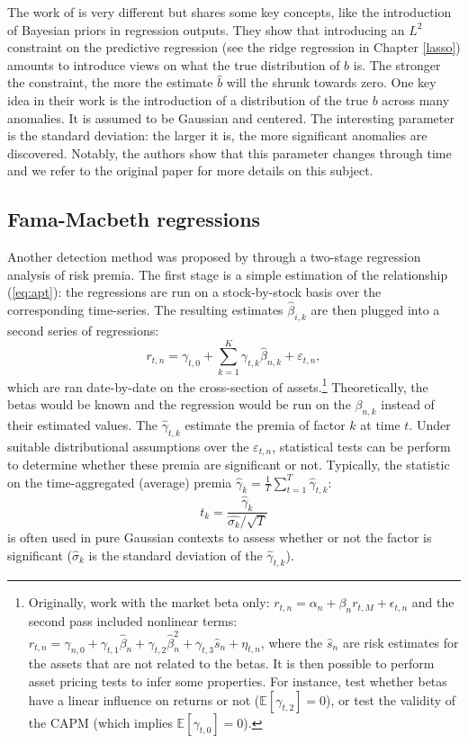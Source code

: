 \documentclass[]{krantz}
\let\rmarkdownfootnote\footnote%
\def\footnote{\protect\rmarkdownfootnote}
\theoremstyle{definition}
\theoremstyle{definition}
\theoremstyle{definition}
\theoremstyle{remark}
\begin{document}
The work of \citet{chinco2019estimating} is very different but shares
some key concepts, like the introduction of Bayesian priors in
regression outputs. They show that introducing an \(L^2\) constraint on
the predictive regression (see the ridge regression in Chapter
\ref{lasso}) amounts to introduce views on what the true distribution of
\(b\) is. The stronger the constraint, the more the estimate \(\hat{b}\)
will the shrunk towards zero. One key idea in their work is the
introduction of a distribution of the true \(b\) across many anomalies.
It is assumed to be Gaussian and centered. The interesting parameter is
the standard deviation: the larger it is, the more significant anomalies
are discovered. Notably, the authors show that this parameter changes
through time and we refer to the original paper for more details on this
subject.

\hypertarget{fama-macbeth-regressions}{%
\subsection{Fama-Macbeth regressions}\label{fama-macbeth-regressions}}

Another detection method was proposed by \citet{fama1973risk} through a
two-stage regression analysis of risk premia. The first stage is a
simple estimation of the relationship (\ref{eq:apt}): the regressions
are run on a stock-by-stock basis over the corresponding time-series.
The resulting estimates \(\hat{\beta}_{i,k}\) are then plugged into a
second series of regressions: \begin{equation}
r_{t,n}= \gamma_{t,0} + \sum_{k=1}^K\gamma_{t,k}\hat{\beta}_{n,k} + \varepsilon_{t,n},
\end{equation} which are ran date-by-date on the cross-section of
assets.\footnote{Originally, \citet{fama1973risk} work with the market
  beta only: \(r_{t,n}=\alpha_n+\beta_nr_{t,M}+\epsilon_{t,n}\) and the
  second pass included nonlinear terms:
  \(r_{t,n}=\gamma_{n,0}+\gamma_{t,1}\hat{\beta}_{n}+\gamma_{t,2}\hat{\beta}^2_n+\gamma_{t,3}\hat{s}_n+\eta_{t,n}\),
  where the \(\hat{s}_n\) are risk estimates for the assets that are not
  related to the betas. It is then possible to perform asset pricing
  tests to infer some properties. For instance, test whether betas have
  a linear influence on returns or not (\(\mathbb{E}[\gamma_{t,2}]=0\)),
  or test the validity of the CAPM (which implies
  \(\mathbb{E}[\gamma_{t,0}]=0\)).} Theoretically, the betas would be
known and the regression would be run on the \(\beta_{n,k}\) instead of
their estimated values. The \(\hat{\gamma}_{t,k}\) estimate the premia
of factor \(k\) at time \(t\). Under suitable distributional assumptions
over the \(\varepsilon_{t,n}\), statistical tests can be perform to
determine whether these premia are significant or not. Typically, the
statistic on the time-aggregated (average) premia
\(\hat{\gamma}_k=\frac{1}{T}\sum_{t=1}^T\hat{\gamma}_{t,k}\):
\[t_k=\frac{\hat{\gamma}_k}{\hat{\sigma_k}/\sqrt{T}}\] is often used in
pure Gaussian contexts to assess whether or not the factor is
significant (\(\hat{\sigma}_k\) is the standard deviation of the
\(\hat{\gamma}_{t,k}\)).
\end{document}
